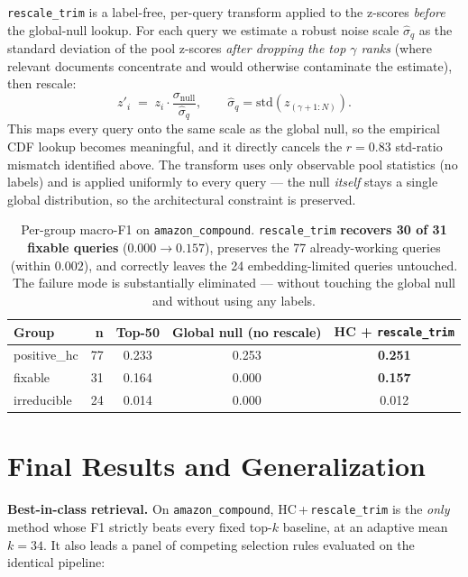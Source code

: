 \documentclass[11pt]{article}
\begin{document}
\texttt{rescale\_trim} is a label-free, per-query transform applied to the
z-scores \emph{before} the global-null lookup. For each query we estimate a
robust noise scale $\hat{\sigma}_q$ as the standard deviation of the pool
z-scores \emph{after dropping the top $\gamma$ ranks} (where relevant documents
concentrate and would otherwise contaminate the estimate), then rescale:
\[
  z'_i \;=\; z_i \cdot \frac{\sigma_{\mathrm{null}}}{\hat{\sigma}_q},
  \qquad
  \hat{\sigma}_q = \mathrm{std}\!\left(z_{(\gamma+1:N)}\right).
\]
This maps every query onto the same scale as the global null, so the empirical
CDF lookup becomes meaningful, and it directly cancels the $r\!=\!0.83$
std-ratio mismatch identified above. The transform uses only observable pool
statistics (no labels) and is applied uniformly to every query --- the null
\emph{itself} stays a single global distribution, so the architectural
constraint is preserved.

\begin{table}[H]
\centering
\begin{tabular}{lrccc}
\toprule
\textbf{Group} & \textbf{n} & \textbf{Top-50} & \textbf{Global null (no rescale)} & \textbf{HC + \texttt{rescale\_trim}} \\
\midrule
positive\_hc & 77 & 0.233 & 0.253 & \textbf{0.251} \\
fixable      & 31 & 0.164 & 0.000 & \textbf{0.157} \\
irreducible  & 24 & 0.014 & 0.000 & 0.012 \\
\bottomrule
\end{tabular}
\caption{Per-group macro-F1 on \texttt{amazon\_compound}. \texttt{rescale\_trim}
\textbf{recovers 30 of 31 fixable queries} ($0.000\!\to\!0.157$), preserves the
77 already-working queries (within $0.002$), and correctly leaves the 24
embedding-limited queries untouched. The failure mode is substantially
eliminated --- without touching the global null and without using any labels.}
\end{table}

\section{Final Results and Generalization}

\textbf{Best-in-class retrieval.} On \texttt{amazon\_compound},
HC\,+\,\texttt{rescale\_trim} is the \emph{only} method whose F1 strictly beats
every fixed top-$k$ baseline, at an adaptive mean $k\!=\!34$. It also leads a
panel of competing selection rules evaluated on the identical pipeline:
\end{document}

